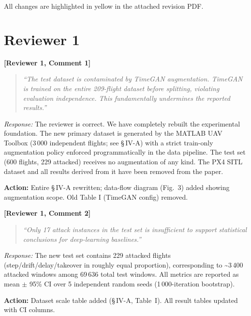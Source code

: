 \documentclass[11pt, a4paper]{article}
\newcommand{\reviewer}[2]{\medskip\noindent\textbf{\textcolor{revcolor}{[Reviewer #1, Comment #2]}}\par}
\newcommand{\response}[1]{\noindent\textit{Response:} #1\par}
\newcommand{\action}[1]{\noindent\textcolor{actcolor}{\textbf{Action:} #1}\smallskip\par}
\newcommand{\quoterev}[1]{\begin{quote}\textit{``#1''}\end{quote}}
\begin{document}
\noindent All changes are highlighted in yellow in the attached revision PDF.

\section*{Reviewer 1}

\reviewer{1}{1}
\quoterev{The test dataset is contaminated by TimeGAN augmentation. TimeGAN is
  trained on the entire 209-flight dataset before splitting, violating evaluation
  independence. This fundamentally undermines the reported results.}
\response{%
  The reviewer is correct. We have completely rebuilt the experimental foundation.
  The new primary dataset is generated by the MATLAB UAV Toolbox (3\,000 independent
  flights; see \S\,IV-A) with a strict train-only augmentation policy enforced
  programmatically in the data pipeline. The test set (600 flights, 229 attacked)
  receives no augmentation of any kind. The PX4 SITL dataset and all results derived
  from it have been removed from the paper.}
\action{Entire \S\,IV-A rewritten; data-flow diagram (Fig.~3) added showing
  augmentation scope. Old Table I (TimeGAN config) removed.}

\reviewer{1}{2}
\quoterev{Only 17 attack instances in the test set is insufficient to support
  statistical conclusions for deep-learning baselines.}
\response{%
  The new test set contains 229 attacked flights (step/drift/delay/takeover in
  roughly equal proportion), corresponding to \textasciitilde{}3\,400 attacked
  windows among 69\,636 total test windows. All metrics are reported as
  mean $\pm$ 95\% CI over 5 independent random seeds (1\,000-iteration bootstrap).}
\action{Dataset scale table added (\S\,IV-A, Table~I). All result tables updated
  with CI columns.}
\end{document}
